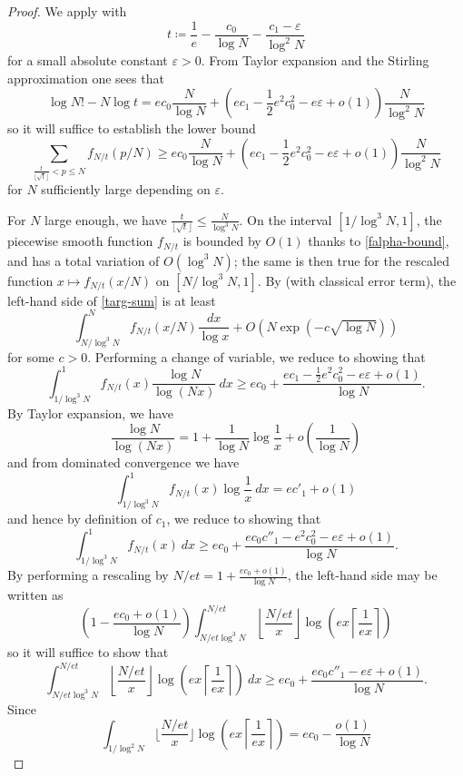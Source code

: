 \documentclass[12pt,a4paper,reqno]{amsart}
\numberwithin{equation}{section}
\theoremstyle{plain}
\theoremstyle{definition}
\newcommand\eps{\varepsilon}
\begin{document}
    \begin{proof}  We apply  with
      $$ t \coloneqq \frac{1}{e} - \frac{c_0}{\log N} - \frac{c_1-\eps}{\log^2 N}$$
    for a small absolute constant $\eps>0$.  From Taylor expansion and the Stirling approximation one sees that
    $$ \log N! - N \log t = ec_0 \frac{N}{\log N} + (ec_1 - \frac{1}{2} e^2 c_0^2 - e\eps+o(1)) \frac{N}{\log^2 N}$$
    so it will suffice to establish the lower bound
    \begin{equation}\label{targ-sum}
      \sum_{\frac{t}{\lfloor\sqrt{t}\rfloor} < p \leq N} f_{N/t}(p/N) \geq ec_0 \frac{N}{\log N} + (ec_1 - \frac{1}{2} e^2 c_0^2 - e \eps + o(1)) \frac{N}{\log^2 N}
    \end{equation}
    for $N$ sufficiently large depending on $\eps$.

    For $N$ large enough, we have $\frac{t}{\lfloor\sqrt{t}\rfloor} \leq \frac{N}{\log^3 N}$.
    On the interval $[1/\log^3 N,1]$, the piecewise smooth function $f_{N/t}$ is bounded by $O(1)$ thanks to \eqref{falpha-bound}, and has a total variation of $O(\log^3 N)$; the same is then true for the rescaled function $x \mapsto f_{N/t}(x/N)$ on $[N/\log^3 N,1]$.  By  (with classical error term), the left-hand side of \eqref{targ-sum} is at least
    $$ \int_{N/\log^3 N}^N f_{N/t}(x/N) \frac{dx}{\log x} + O\left( N \exp(-c\sqrt{\log N}) \right)$$
    for some $c>0$.  Performing a change of variable, we reduce to showing that
    $$  \int_{1/\log^3 N}^1 f_{N/t}(x) \frac{\log N}{\log(Nx)}\ dx 
    \geq  ec_0 + \frac{ec_1 - \frac{1}{2} e^2 c_0^2 - e \eps + o(1)}{\log N}.$$
    By Taylor expansion, we have
    $$ \frac{\log N}{\log(Nx)} = 1 + \frac{1}{\log N} \log \frac{1}{x} + o(\frac{1}{\log N})$$
    and from dominated convergence we have
  $$
  \int_{1/\log^3 N}^1 f_{N/t}(x) \log \frac{1}{x}\ dx = ec'_1 + o(1)$$
and hence by definition of $c_1$, we reduce to showing that
$$  \int_{1/\log^3 N}^1 f_{N/t}(x)\ dx 
\geq  ec_0 + \frac{ec_0 c''_1 - e^2 c_0^2 - e\eps + o(1)}{\log N}.$$
By performing a rescaling by $N/et = 1 + \frac{ec_0+o(1)}{\log N}$, the left-hand side may be written as
$$ \left(1 - \frac{ec_0+o(1)}{\log N}\right) \int_{N/et\log^3 N}^{N/et}
\left\lfloor \frac{N/et}{x} \right\rfloor \log\left(ex \left\lceil \frac{1}{ex} \right\rceil \right) $$
so it will suffice to show that
$$
\int_{N/et\log^3 N}^{N/et}
\left\lfloor \frac{N/et}{x} \right\rfloor \log\left(ex \left\lceil \frac{1}{ex} \right\rceil \right)\ dx \geq ec_0 + \frac{ec_0 c''_1 - e\eps + o(1)}{\log N}.$$
Since
$$ \int_{1/\log^2 N} \lfloor \frac{N/et}{x} \rfloor \log\left(ex \left\lceil \frac{1}{ex} \right\rceil \right) = ec_0 - \frac{o(1)}{\log N}$$

\end{proof}
\end{document}
